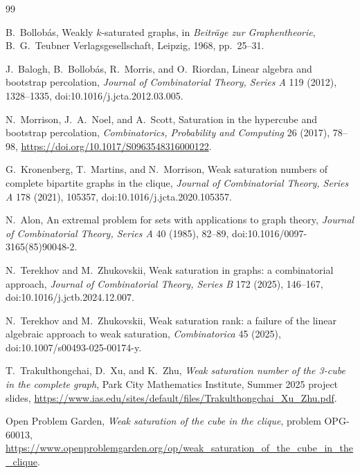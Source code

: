 \documentclass[11pt]{article}
\numberwithin{equation}{section}
\begin{document}
\newpage

\begingroup\sloppy
\begin{thebibliography}{99}

B.~Bollob\'as,
\newblock Weakly $k$-saturated graphs,
\newblock in \emph{Beitr\"age zur Graphentheorie}, B.~G.~Teubner Verlagsgesellschaft, Leipzig, 1968, pp.~25--31.

J.~Balogh, B.~Bollob\'as, R.~Morris, and O.~Riordan,
\newblock Linear algebra and bootstrap percolation,
\newblock \emph{Journal of Combinatorial Theory, Series A} 119 (2012), 1328--1335,
\newblock doi:10.1016/j.jcta.2012.03.005.

N.~Morrison, J.~A.~Noel, and A.~Scott,
Saturation in the hypercube and bootstrap percolation, \emph{Combinatorics, Probability and Computing} 26 (2017), 78--98, \url{https://doi.org/10.1017/S0963548316000122}.

G.~Kronenberg, T.~Martins, and N.~Morrison,
\newblock Weak saturation numbers of complete bipartite graphs in the clique,
\newblock \emph{Journal of Combinatorial Theory, Series A} 178 (2021), 105357,
\newblock doi:10.1016/j.jcta.2020.105357.

N.~Alon,
\newblock An extremal problem for sets with applications to graph theory,
\newblock \emph{Journal of Combinatorial Theory, Series A} 40 (1985), 82--89,
\newblock doi:10.1016/0097-3165(85)90048-2.

N.~Terekhov and M.~Zhukovskii,
\newblock Weak saturation in graphs: a combinatorial approach,
\newblock \emph{Journal of Combinatorial Theory, Series B} 172 (2025), 146--167,
\newblock doi:10.1016/j.jctb.2024.12.007.

N.~Terekhov and M.~Zhukovskii,
\newblock Weak saturation rank: a failure of the linear algebraic approach to weak saturation,
\newblock \emph{Combinatorica} 45 (2025),
\newblock doi:10.1007/s00493-025-00174-y.

T.~Trakulthongchai, D.~Xu, and K.~Zhu,
\newblock \emph{Weak saturation number of the 3-cube in the complete graph},
\newblock Park City Mathematics Institute, Summer 2025 project slides,
\newblock \url{https://www.ias.edu/sites/default/files/Trakulthongchai_Xu_Zhu.pdf}.

Open Problem Garden,
\newblock \emph{Weak saturation of the cube in the clique}, problem OPG-60013,
\newblock \url{https://www.openproblemgarden.org/op/weak_saturation_of_the_cube_in_the_clique}.

\end{thebibliography}
\endgroup
\end{document}
